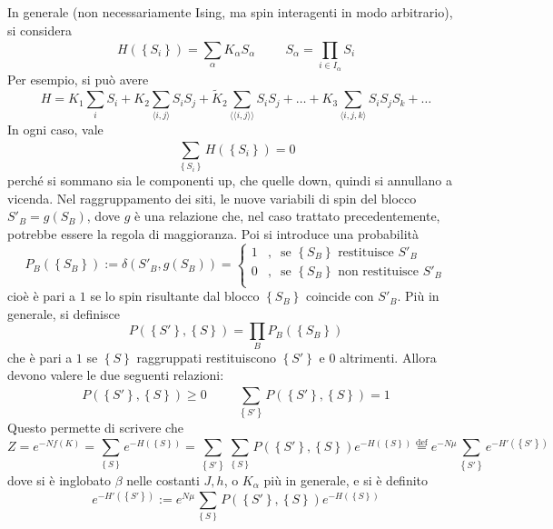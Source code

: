 \documentclass[11pt, a4paper]{scrartcl}
\theoremstyle{style}
\theoremstyle{style1}
\numberwithin{equation}{subsection}
\begin{document}
In generale (non necessariamente Ising, ma spin interagenti in modo arbitrario), si considera
\[
H \left(\left\{ S_i \right\} \right) = \sum_{\alpha }^{} K_\alpha S_\alpha \hspace{1cm} S_ \alpha  = \prod_{i \in I_\alpha } S_i
\] 
Per esempio, si pu\`o avere 
\[
H = K_1 \sum_{i}^{} S_i + K_2 \sum_{\langle i,j \rangle}^{} S_iS_j + \tilde{K}_2 \sum_{\langle \langle i,j \rangle \rangle}^{} S_iS_j + \ldots + K_3 \sum_{\langle i,j,k \rangle}^{} S_iS_jS_k +\ldots
\] 
In ogni caso, vale
\[
\sum_{\left\{ S_i \right\} }^{} H\left(\left\{ S_i \right\} \right) =0
\] 
perch\'e si sommano sia le componenti up, che quelle down, quindi si annullano a vicenda.
Nel raggruppamento dei siti, le nuove variabili di spin del blocco $S'_B = g(S_B)$, dove $g$ \`e una relazione che, nel caso trattato precedentemente, potrebbe essere la regola di maggioranza.
Poi si introduce una probabilit\`a 
\[
P_B \left(\left\{ S_B \right\} \right)  := \delta \left(S'_B , g(S_B)\right)  = \begin{cases}
	1 &,\ \text{ se } \left\{ S_B \right\} \text{ restituisce } S'_B\\
	0 &,\ \text{ se } \left\{ S_B \right\}\text{ non restituisce } S'_B\\
\end{cases}
\] 
cio\`e \`e pari a $1$ se lo spin risultante dal blocco $\left\{ S_B \right\} $ coincide con $S'_B$.
Pi\`u in generale, si definisce
\[
P\left(\left\{ S' \right\} , \left\{ S \right\} \right) = \prod_B P_B \left(\left\{ S_B \right\} \right) 
\] 
che \`e pari a $1$ se $\left\{ S \right\} $ raggruppati restituiscono $\left\{ S' \right\} $ e $0$ altrimenti.
Allora devono valere le due seguenti relazioni:
\[
P\left(\left\{ S' \right\} ,\left\{ S \right\} \right) \ge 0 \hspace{1cm}\sum_{\left\{ S' \right\} }^{} P\left(\left\{ S' \right\} , \left\{ S \right\} \right) =1
\] 
Questo permette di scrivere che
\[
Z = e^{-N f(K)}= \sum_{\left\{ S \right\} }^{} e^{- H \left(\left\{ S \right\} \right) }= \sum_{\left\{ S' \right\} }^{} \sum_{\left\{ S \right\} }^{} P\left(\left\{ S' \right\} , \left\{ S \right\} \right)  e^{-H\left(\left\{ S \right\} \right) } \overset{\text{def}}{=} e^{-N\mu } \sum_{\left\{ S' \right\} }^{} e^{-H' \left(\left\{ S' \right\} \right) }
\] 
dove si \`e inglobato $\beta $ nelle costanti $J,h$, o $K_\alpha $ pi\`u in generale, e si \`e definito
\[
e^{-H' \left(\left\{ S' \right\} \right) } := e^{N\mu }\sum_{\left\{ S \right\} }^{} P\left(\left\{ S' \right\} , \left\{ S \right\} \right)  e^{-H \left(\left\{ S \right\} \right) }
\] 
\end{document}
